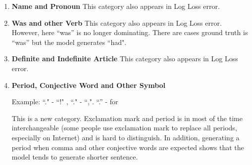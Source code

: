 \documentclass{article}
\begin{document}
\begin{enumerate}
\item \textbf{Name and Pronoun} This category also appears in Log Loss error.
\item \textbf{Was and other Verb} This category also appears in Log Loss error. However, here ``was'' is no longer dominating. There are cases ground truth is ``was'' but the model generates ``had".
\item \textbf{Definite and Indefinite Article} This category also appears in Log Loss error.
\item \textbf{Period, Conjective Word and Other Symbol} 

Example: ``." - ``!" , ``." - ``,". ``.'' - for

This is a new category. Exclamation mark and period is in most of the time interchangeable (some people use exclamation mark to replace all periods, especially on Internet) and is hard to distinguish. In addition, generating a period when comma and other conjective words are expected shows that the model tends to generate shorter sentence.

\end{enumerate}
\end{document}
